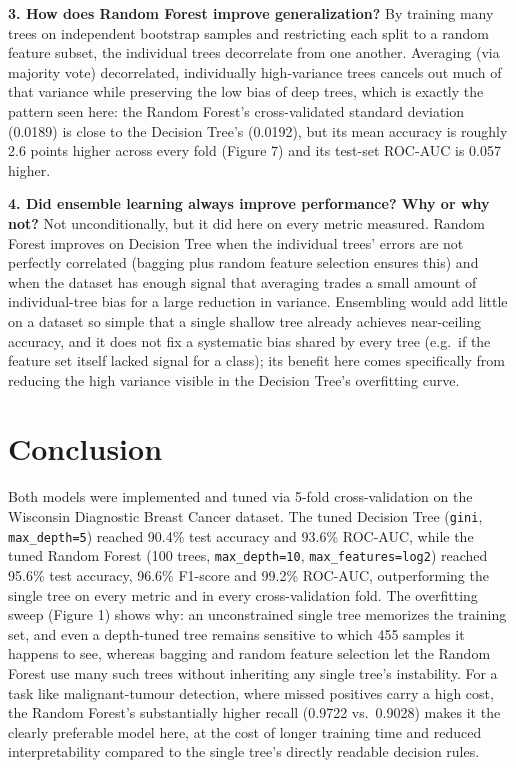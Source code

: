 \documentclass[12pt,a4paper]{article}
\begin{document}
\textbf{3. How does Random Forest improve generalization?} By training many trees on
independent bootstrap samples and restricting each split to a random feature subset,
the individual trees decorrelate from one another. Averaging (via majority vote)
decorrelated, individually high-variance trees cancels out much of that variance while
preserving the low bias of deep trees, which is exactly the pattern seen here: the
Random Forest's cross-validated standard deviation (0.0189) is close to the Decision
Tree's (0.0192), but its mean accuracy is roughly 2.6 points higher across every fold
(Figure 7) and its test-set ROC-AUC is 0.057 higher.

\textbf{4. Did ensemble learning always improve performance? Why or why not?} Not
unconditionally, but it did here on every metric measured. Random Forest improves on
Decision Tree when the individual trees' errors are not perfectly correlated (bagging
plus random feature selection ensures this) and when the dataset has enough signal
that averaging trades a small amount of individual-tree bias for a large reduction in
variance. Ensembling would add little on a dataset so simple that a single shallow
tree already achieves near-ceiling accuracy, and it does not fix a systematic bias
shared by every tree (e.g.\ if the feature set itself lacked signal for a class); its
benefit here comes specifically from reducing the high variance visible in the
Decision Tree's overfitting curve.

\section{Conclusion}
Both models were implemented and tuned via 5-fold cross-validation on the Wisconsin
Diagnostic Breast Cancer dataset. The tuned Decision Tree (\texttt{gini},
\texttt{max\_depth=5}) reached 90.4\% test accuracy and 93.6\% ROC-AUC, while the tuned
Random Forest (100 trees, \texttt{max\_depth=10}, \texttt{max\_features=log2}) reached
95.6\% test accuracy, 96.6\% F1-score and 99.2\% ROC-AUC, outperforming the single tree
on every metric and in every cross-validation fold. The overfitting sweep (Figure 1)
shows why: an unconstrained single tree memorizes the training set, and even a
depth-tuned tree remains sensitive to which 455 samples it happens to see, whereas
bagging and random feature selection let the Random Forest use many such trees without
inheriting any single tree's instability. For a task like malignant-tumour detection,
where missed positives carry a high cost, the Random Forest's substantially higher
recall (0.9722 vs.\ 0.9028) makes it the clearly preferable model here, at the cost of
longer training time and reduced interpretability compared to the single tree's
directly readable decision rules.
\end{document}
